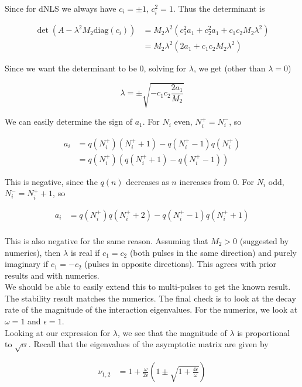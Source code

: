 \documentclass[12pt]{article}
\begin{document}
Since for dNLS we always have $c_i = \pm 1$, $c_i^2 = 1$. Thus the determinant is

\begin{align*}
\det( A - \lambda^2 M_2 \text{diag}(c_i)) &= 
M_2 \lambda^2 ( c_1^2 a_1 + c_2^2 a_1 + c_1 c_2 M_2 \lambda^2 ) \\
&= M_2 \lambda^2 ( 2 a_1 + c_1 c_2 M_2 \lambda^2 )
\end{align*}

Since we want the determinant to be 0, solving for $\lambda$, we get (other than $\lambda = 0$)

\[
\lambda = \pm \sqrt{ -c_1 c_2 \frac{2 a_1}{M_2}}
\]

We can easily determine the sign of $a_1$. For $N_i$ even, $N_i^+ = N_i^-$, so

\begin{align*}
a_i &= q(N_i^+)(N_i^+ + 1) - q(N_i^+ - 1)q(N_i^+)\\
&= q(N_i^+)( q(N_i^+ + 1) - q(N_i^+ - 1))
\end{align*} 

This is negative, since the $q(n)$ decreases as $n$ increases from 0. For $N_i$ odd, $N_i^- = N_i^+ +1$, so

\begin{align*}
a_i &= q(N_i^+)q(N_i^+ + 2) - q(N_i^+ - 1)q(N_i^+ + 1)\\
\end{align*}

This is also negative for the same reason. Assuming that $M_2 > 0$ (suggested by numerics), then $\lambda$ is real if $c_1 = c_2$ (both pulses in the same direction) and purely imaginary if $c_1 = -c_2$ (pulses in opposite directions). This agrees with prior results and with numerics.\\

We should be able to easily extend this to multi-pulses to get the known result.\\

The stability result matches the numerics. The final check is to look at the decay rate of the magnitude of the interaction eigenvalues. For the numerics, we look at $\omega = 1$ and $\epsilon = 1$.\\

Looking at our expression for $\lambda$, we see that the magnitude of $\lambda$ is proportional to $\sqrt{\alpha}$. Recall that the eigenvalues of the asymptotic matrix are given by

\begin{align*}
\nu_{1,2} &= 1 + \frac{\omega}{2 \epsilon} \left( 1 \pm \sqrt{1 + \frac{4 \epsilon}{\omega}} \right)
\end{align*}
\end{document}
